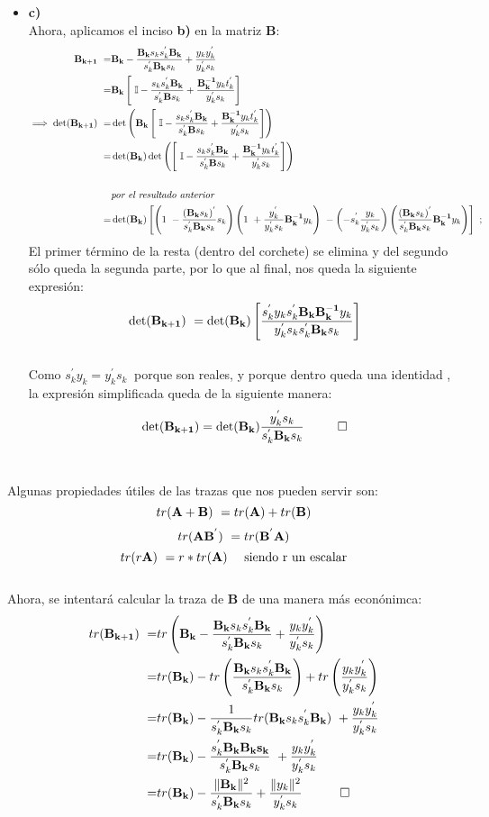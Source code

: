 \documentclass[12pt]{article}
\newcommand{\ident}{\mathbb{I}}
\newcommand{\noi}{\noindent}
\newcommand{\beas}{\begin{eqnarray*}}
\newcommand{\eeas}{\end{eqnarray*}}
\begin{document}
\begin{itemize}
\item{\bf c)}\\ 
\noi Ahora, aplicamos el inciso {\bf b)} en la matriz {\bf B}:
\beas
{\bf B_{k+1}}\ =&{\bf B_{k}} - \frac{{\bf B_{k}}s_ks_k^{'}{\bf B_k}}{s_k^{'}{\bf B_k}s_k} + \frac{y_ky_k^{'}}{y_k^{'}s_k}\\
\ =&{\bf B_k}\left[\ \ident -\frac{s_ks_k^{'}{\bf B_k}}{s_k^{'}{\bf B}s_k}+\frac{{\bf B_k^{-1}}y_kt_k^{'}}{y_k^{'}s_k}\right]\\
\implies \det({\bf B_{k+1}})\ =& \det\left({\bf B_k}\left[\ \ident -\frac{s_ks_k^{'}{\bf B_k}}{s_k^{'}{\bf B}s_k}+\frac{{\bf B_k^{-1}}y_kt_k^{'}}{y_k^{'}s_k}\right]\right)\\
\ =&\det({\bf B_k})\det\left(\left[\ \ident -\frac{s_ks_k^{'}{\bf B_k}}{s_k^{'}{\bf B}s_k}+\frac{{\bf B_k^{-1}}y_kt_k^{'}}{y_k^{'}s_k}\right]\right)\\ \\
\ &\text{\it por el resultado anterior}\\
\ =&\det({\bf B_k})\left[\left(1\ -\frac{({\bf B_k}s_k)^{'}}{s_k^{'}{\bf B_k}s_k}s_k\right)\left(1\ +\frac{y_k^{'}}{y_k^{'}s_k}{\bf B_k^{-1}}y_k\right)\ -\left(-s_k^{'}\frac{y_k}{y_k^{'}s_k}\right)\left(\frac{({\bf B_k}s_k)^{'}}{s_k^{'}{\bf B_k}s_k}{\bf B_k^{-1}}y_k\right)\right]\ ;\\
\eeas
\noi El primer t\'ermino de la resta (dentro del corchete) se elimina y del segundo s\'olo queda la segunda parte, por lo que al final, nos queda la siguiente expresi\'on:
$$\det({\bf B_{k+1}})\ =\det({\bf B_k})\left[\frac{s_k^{'}y_ks_k^{'}{\bf B_k}{\bf B_k^{-1}}y_k}{y_k^{'}s_ks_k^{'}{\bf B_k}s_k}\right] $$\\
\noi Como $s_k^{'}y_k = y_k^{'}s_k\ $ porque son reales, y porque dentro queda una identidad , la expresi\'on simplificada queda de la siguiente manera:
$$\det({\bf B_{k+1}})= \det({\bf B_k})\frac{y_k^{'}s_k}{s_k^{'}{\bf B_k}s_k}\ \ \qed$$\\ 
\end{itemize}
\noi{\bf 6.11}

\noi Algunas propiedades \'utiles de las trazas que nos pueden servir son:
$$tr({\bf A+B})\ = tr({\bf A})+ tr({\bf B})$$
$$tr({\bf AB^{'}})\ =tr({\bf B^{'}A})$$
$$tr(r{\bf A})\ =r*tr({\bf A})\ \ \ \  \text{siendo r un escalar}$$\\
\noi Ahora, se intentar\'a calcular la traza de {\bf B} de una manera m\'as econ\'onimca:
\beas
tr({\bf B_{k+1}})\ =& tr\left({\bf B_k} - \frac{{\bf B_k}s_ks_k^{'}{\bf B_k}}{s_k^{'}{\bf B_k}s_k} + \frac{y_ky_k^{'}}{y_k^{'}s_k}\right)\\
\ =&tr({\bf B_k}) - tr\left(\frac{{\bf B_k}s_ks_k^{'}{\bf B_k}}{s_k^{'}{\bf B_k}s_k}\right) + tr\left(\frac{y_ky_k^{'}}{y_k^{'}s_k}\right)\\
\ =&tr({\bf B_k}) - \frac{1}{s_k^{'}{\bf B_k}s_k}tr({\bf B_k}s_ks_k^{'}{\bf B_k})\  + \frac{y_ky_k^{'}}{y_k^{'}s_k}\\
\ =&tr({\bf B_k}) - \frac{s_k^{'}{\bf B_k{\bf B_k}s_k}}{s_k^{'}{\bf B_k}s_k}\  + \frac{y_ky_k^{'}}{y_k^{'}s_k}\\
\ =&tr({\bf B_k}) - \frac{\|{\bf B_k}\|^{2}}{s_k^{'}{\bf B_k}s_k} +\frac{\|y_k\|^{2}}{y_k^{'}s_k}\ \ \ \qed\\
\eeas\\
\end{document}
